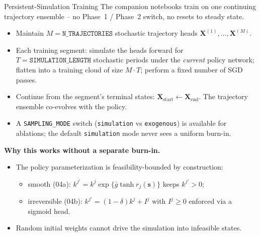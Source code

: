 \documentclass[aspectratio=169,11pt]{beamer}
\newcommand{\emphc}[1]{\textcolor{harvardcrimson}{#1}}
\begin{document}
\begin{frame}{Persistent-Simulation Training}
The companion notebooks train on \emphc{one continuing trajectory ensemble} -- no Phase~1 / Phase~2 switch, no resets to steady state.

\vspace{0.4em}
\begin{itemize}
    \item Maintain $M = \texttt{N\_TRAJECTORIES}$ stochastic trajectory heads $\bm{X}^{(1)}, \ldots, \bm{X}^{(M)}$.
    \item Each \emphc{training segment}: simulate the heads forward for $T = \texttt{SIMULATION\_LENGTH}$ stochastic periods under the \emph{current} policy network; flatten into a training cloud of size $M\!\cdot\!T$; perform a fixed number of SGD passes.
    \item Continue from the segment's terminal states: $\bm{X}_{\mathrm{start}} \leftarrow \bm{X}_{\mathrm{end}}$. The trajectory ensemble \emphc{co-evolves} with the policy.
    \item A \texttt{SAMPLING\_MODE} switch (\texttt{simulation} vs \texttt{exogenous}) is available for ablations; the default \texttt{simulation} mode never sees a uniform burn-in.
\end{itemize}

\vspace{0.3em}
\textbf{Why this works without a separate burn-in.}
\begin{itemize}
    \item The policy parameterization is feasibility-bounded by construction:
    \begin{itemize}\itemsep1pt
        \item smooth (04a): $k^{j\prime} = k^j \exp\{\bar g \tanh r_j(\bm{s})\}$ keeps $k^{j\prime} > 0$;
        \item irreversible (04b): $k^{j\prime} = (1-\delta)k^j + I^j$ with $I^j \ge 0$ enforced via a sigmoid head.
    \end{itemize}
    \item Random initial weights cannot drive the simulation into infeasible states.
\end{itemize}
\end{frame}
\end{document}

